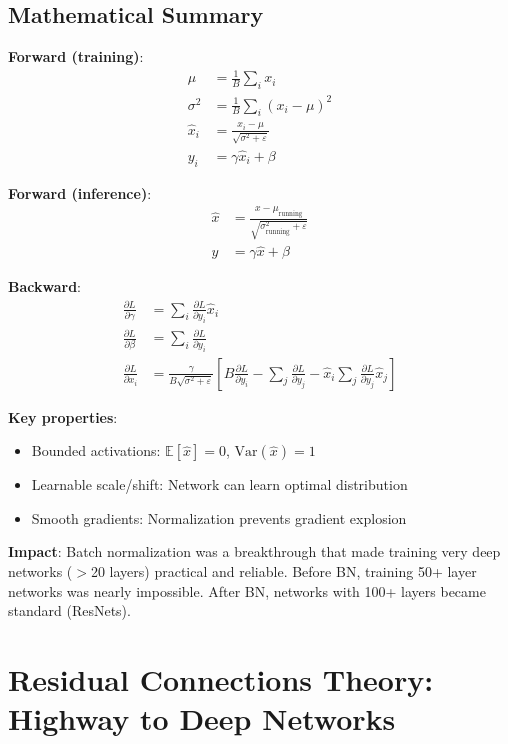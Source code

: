 \subsection{Mathematical Summary}

\textbf{Forward (training)}:
\begin{align*}
\mu &= \frac{1}{B} \sum_i x_i \\
\sigma^2 &= \frac{1}{B} \sum_i (x_i - \mu)^2 \\
\hat{x}_i &= \frac{x_i - \mu}{\sqrt{\sigma^2 + \varepsilon}} \\
y_i &= \gamma \hat{x}_i + \beta
\end{align*}

\textbf{Forward (inference)}:
\begin{align*}
\hat{x} &= \frac{x - \mu_{\text{running}}}{\sqrt{\sigma^2_{\text{running}} + \varepsilon}} \\
y &= \gamma \hat{x} + \beta
\end{align*}

\textbf{Backward}:
\begin{align*}
\frac{\partial L}{\partial \gamma} &= \sum_i \frac{\partial L}{\partial y_i} \hat{x}_i \\
\frac{\partial L}{\partial \beta} &= \sum_i \frac{\partial L}{\partial y_i} \\
\frac{\partial L}{\partial x_i} &= \frac{\gamma}{B\sqrt{\sigma^2 + \varepsilon}} \left[B\frac{\partial L}{\partial y_i} - \sum_j\frac{\partial L}{\partial y_j} - \hat{x}_i\sum_j\frac{\partial L}{\partial y_j}\hat{x}_j\right]
\end{align*}

\textbf{Key properties}:
\begin{itemize}
\item Bounded activations: $\mathbb{E}[\hat{x}] = 0$, $\text{Var}(\hat{x}) = 1$
\item Learnable scale/shift: Network can learn optimal distribution
\item Smooth gradients: Normalization prevents gradient explosion
\end{itemize}

\textbf{Impact}: Batch normalization was a breakthrough that made training very deep networks ($>$20 layers) practical and reliable. Before BN, training 50+ layer networks was nearly impossible. After BN, networks with 100+ layers became standard (ResNets).

\section{Residual Connections Theory: Highway to Deep Networks}


